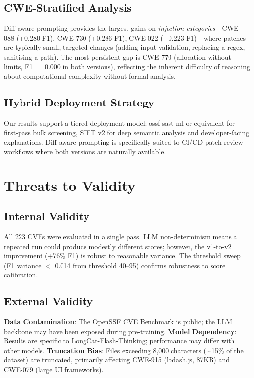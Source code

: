 \documentclass[conference]{IEEEtran}
\begin{document}
\subsection{CWE-Stratified Analysis}

Diff-aware prompting provides the largest gains on \textit{injection categories}---CWE-088 (+0.280 F1), CWE-730 (+0.286 F1), CWE-022 (+0.223 F1)---where patches are typically small, targeted changes (adding input validation, replacing a regex, sanitising a path). The most persistent gap is CWE-770 (allocation without limits, F1~=~0.000 in both versions), reflecting the inherent difficulty of reasoning about computational complexity without formal analysis.

\subsection{Hybrid Deployment Strategy}

Our results support a tiered deployment model: ossf-sast-ml or equivalent for first-pass bulk screening, SIFT v2 for deep semantic analysis and developer-facing explanations. Diff-aware prompting is specifically suited to CI/CD patch review workflows where both versions are naturally available.

\section{Threats to Validity}

\subsection{Internal Validity}
All 223 CVEs were evaluated in a single pass. LLM non-determinism means a repeated run could produce modestly different scores; however, the v1-to-v2 improvement (+76\% F1) is robust to reasonable variance. The threshold sweep (F1 variance $<$ 0.014 from threshold 40--95) confirms robustness to score calibration.

\subsection{External Validity}
\textbf{Data Contamination}: The OpenSSF CVE Benchmark is public; the LLM backbone may have been exposed during pre-training. \textbf{Model Dependency}: Results are specific to LongCat-Flash-Thinking; performance may differ with other models. \textbf{Truncation Bias}: Files exceeding 8,000 characters ($\sim$15\% of the dataset) are truncated, primarily affecting CWE-915 (lodash.js, 87KB) and CWE-079 (large UI frameworks).
\end{document}
